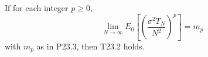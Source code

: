 If for each integer \(p \geq 0\),
\[
\lim_{N \to \infty} E_0\!\left[\left(\frac{\sigma^2 T_N}{N^2}\right)^p\right] = m_p
\]
with \(m_p\) as in P23.3, then T23.2 holds.
